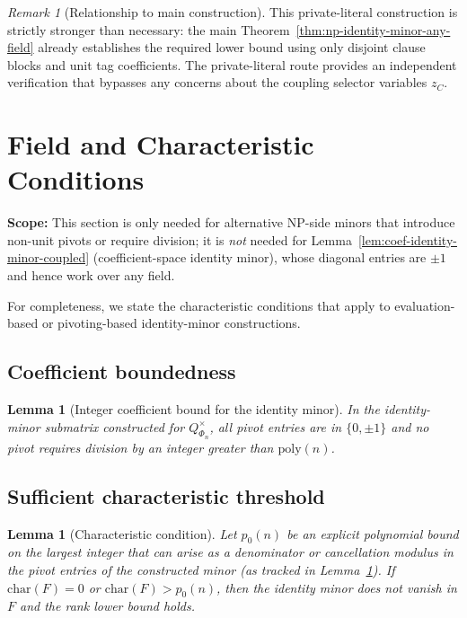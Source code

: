 \documentclass[12pt]{article}
\newcommand{\poly}{\mathrm{poly}}
\newtheorem{lemma}[theorem]{Lemma}
\theoremstyle{definition}
\theoremstyle{definition}
\theoremstyle{remark}
\newtheorem{remark}{Remark}
\theoremstyle{remark}
\begin{document}
\begin{remark}[Relationship to main construction]
This private-literal construction is strictly stronger than necessary: the main
Theorem~\ref{thm:np-identity-minor-any-field} already establishes the required lower bound
using only disjoint clause blocks and unit tag coefficients. The private-literal route
provides an independent verification that bypasses any concerns about the coupling
selector variables $z_C$.
\end{remark}

\section{Field and Characteristic Conditions}
\label{sec:field-regime}

\textbf{Scope:} This section is only needed for alternative NP-side minors that
introduce non-unit pivots or require division; it is \emph{not} needed for
Lemma~\ref{lem:coef-identity-minor-coupled} (coefficient-space identity minor),
whose diagonal entries are $\pm 1$ and hence work over any field.

For completeness, we state the characteristic conditions that apply to
evaluation-based or pivoting-based identity-minor constructions.

\subsection{Coefficient boundedness}
\label{subsec:coeff-bounds}

\begin{lemma}[Integer coefficient bound for the identity minor]
\label{lem:coeff-bound}
In the identity-minor submatrix constructed for $Q^{\times}_{\Phi_n}$, all pivot
entries are in $\{0,\pm 1\}$ and no pivot requires division by an integer
greater than $\poly(n)$.
\end{lemma}

\subsection{Sufficient characteristic threshold}
\label{subsec:char-threshold}

\begin{lemma}[Characteristic condition]
\label{lem:char-condition}
Let $p_0(n)$ be an explicit polynomial bound on the largest integer that
can arise as a denominator or cancellation modulus in the pivot entries of
the constructed minor (as tracked in Lemma~\ref{lem:coeff-bound}). If
$\mathrm{char}(F)=0$ or $\mathrm{char}(F)>p_0(n)$, then the identity minor
does not vanish in $F$ and the rank lower bound holds.
\end{lemma}
\end{document}
